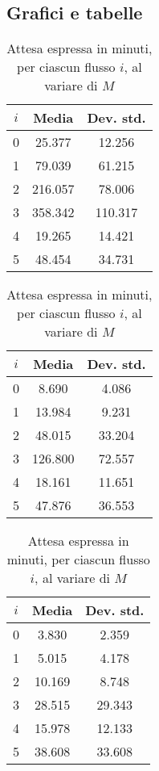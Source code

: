 \subsection{Grafici e tabelle}
\begin{table}[ht]
\centering
\begin{subtable}{0.33\textwidth}
\centering
{\tablecolors
\begin{tabular}{|c|c|c|}
\hline
$i$ & Media & Dev. std. \\
\hline
0 & {\color{red}25.377} & 12.256 \\
\hline
1 & {\color{red}79.039} & 61.215 \\
\hline
2 & {\color{red}216.057} & 78.006 \\
\hline
3 & {\color{red}358.342} & 110.317 \\
\hline
4 & 19.265 & 14.421 \\
\hline
5 & 48.454 & 34.731 \\
\hline
\end{tabular}}
\caption{$M = 2$}
\label{table:miglioria-esperimenti-simulazione-1a}
\end{subtable}%
\begin{subtable}{0.33\textwidth}
\centering
{\tablecolors
\begin{tabular}{|c|c|c|}
\hline
$i$ & Media & Dev. std. \\
\hline
0 & 8.690 & 4.086 \\
\hline
1 & 13.984 & 9.231 \\
\hline
2 & 48.015 & 33.204 \\
\hline
3 & 126.800 & 72.557 \\
\hline
4 & 18.161 & 11.651 \\
\hline
5 & 47.876 & 36.553 \\
\hline
\end{tabular}}
\caption{$M = 3$}
\end{subtable}%
\begin{subtable}{0.33\textwidth}
\centering
{\tablecolors
\begin{tabular}{|c|c|c|}
\hline
$i$ & Media & Dev. std. \\
\hline
0 & 3.830 & 2.359 \\
\hline
1 & 5.015 & 4.178 \\
\hline
2 & 10.169 & 8.748 \\
\hline
3 & 28.515 & 29.343 \\
\hline
4 & 15.978 & 12.133 \\
\hline
5 & 38.608 & 33.608 \\
\hline
\end{tabular}}
\caption{$M = 4$}
\end{subtable}
\caption{Attesa espressa in minuti, per ciascun flusso $i$, al variare di $M$}
\label{table:miglioria-esperimenti-simulazione-1}
\end{table}

